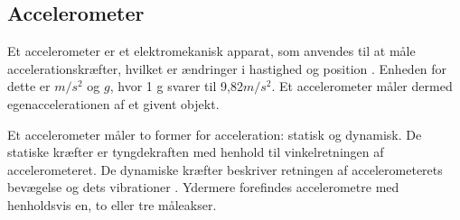 \subsection{Accelerometer}
Et accelerometer er et elektromekanisk apparat, som anvendes til at måle accelerationskræfter, hvilket er ændringer i hastighed og position \citep{Goodrich2013,TittertonWeston2004}. Enheden for dette er $m/s^2$ og $g$, hvor 1 g svarer til 9,82$m/s^2$. Et accelerometer måler dermed egenaccelerationen af et givent objekt. \citep{Sparkfun,TittertonWeston2004}

Et accelerometer måler to former for acceleration: statisk og dynamisk. De statiske kræfter er tyngdekraften med henhold til vinkelretningen af accelerometeret. De dynamiske kræfter beskriver retningen af accelerometerets bevægelse og dets vibrationer \citep{Sparkfun,Goodrich2013,Engineering}. Ydermere forefindes accelerometre med henholdsvis en, to eller tre måleakser. \citep{TittertonWeston2004} 

